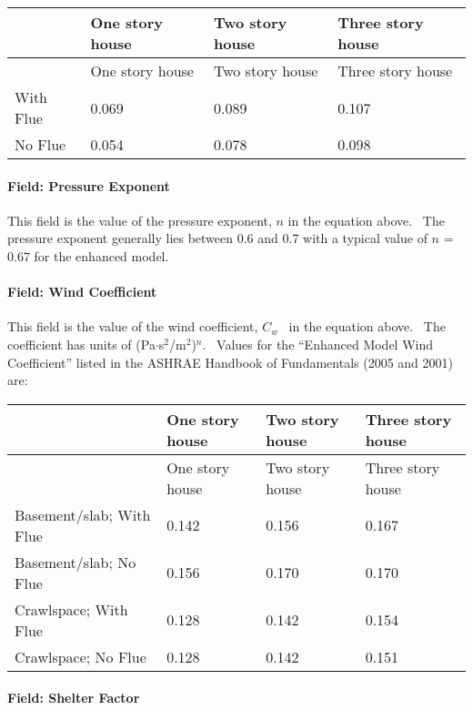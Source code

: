 \begin{longtable}[c]{@{}llll@{}}
\toprule
~ & One story house & Two story house & Three story house \tabularnewline
\midrule
\endfirsthead

\toprule
~ & One story house & Two story house & Three story house \tabularnewline
\midrule
\endhead

With Flue & 0.069 & 0.089 & 0.107 \tabularnewline
No Flue & 0.054 & 0.078 & 0.098 \tabularnewline
\bottomrule
\end{longtable}

\paragraph{Field: Pressure Exponent}\label{field-pressure-exponent}

This field is the value of the pressure exponent, $n$ in the equation above.~ The pressure exponent generally lies between 0.6 and 0.7 with a typical value of $n$ = 0.67 for the enhanced model.

\paragraph{Field: Wind Coefficient}\label{field-wind-coefficient-1}

This field is the value of the wind coefficient, \({C_w}\) ~in the equation above.~ The coefficient has units of (Pa$\cdot$s\(^{2}\)/m\(^{2}\))\(^{n}\).~ Values for the ``Enhanced Model Wind Coefficient'' listed in the ASHRAE Handbook of Fundamentals (2005 and 2001) are:

\begin{longtable}[c]{p{1.5in}p{1.5in}p{1.5in}p{1.5in}}
\toprule
~ & One story house & Two story house & Three story house \tabularnewline
\midrule
\endfirsthead

\toprule
~ & One story house & Two story house & Three story house \tabularnewline
\midrule
\endhead

Basement/slab; With Flue & 0.142 & 0.156 & 0.167 \tabularnewline
Basement/slab; No Flue & 0.156 & 0.170 & 0.170 \tabularnewline
Crawlspace; With Flue & 0.128 & 0.142 & 0.154 \tabularnewline
Crawlspace; No Flue & 0.128 & 0.142 & 0.151 \tabularnewline
\bottomrule
\end{longtable}

\paragraph{Field: Shelter Factor}\label{field-shelter-factor}


